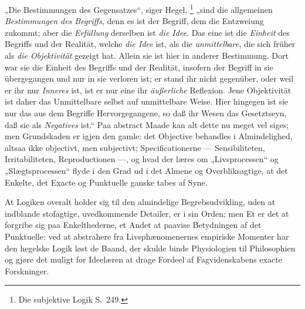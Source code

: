 \documentclass[12pt]{book}
\newcommand{\opage}[1]{\marginnote{\footnotesize\textit{[#1]}}}
\begin{document}
„Die Bestimmungen des Gegensatzes“, siger Hegel,%
\footnote{Die subjektive Logik S.~249.}
„sind die allgemeinen \emph{Bestimmungen des Begriffs}, denn es ist der Begriff, dem die
Entzweiung zukommt; aber die \emph{Erfüllung} derselben ist \emph{die Idee}. Das eine ist die
\emph{Einheit} des Begriffs und der Realität, welche \emph{die Idee} ist, als die
\emph{unmittelbare}, die sich früher als \emph{die Objektivität} gezeigt hat. Allein sie ist hier
in anderer Bestimmung. Dort war sie die Einheit des Begriffs und der Realität, insofern der
Begriff in sie übergegangen und nur in sie verloren ist; er stand ihr nicht gegenüber, oder weil
er ihr nur \emph{Inneres} ist, ist er nur eine ihr \emph{äußerliche} Reflexion. Jene Objektivität
ist daher das Unmittelbare selbst auf unmittelbare Weise. Hier hingegen ist sie nur das aus dem
Begriffe Hervorgegangene, so daß ihr Wesen das Gesetztseyn, daß sie als \emph{Negatives} ist.“
Paa abstract Maade kan alt dette nu meget vel siges; men Grundskaden er igjen den gamle: det
Objective behandles i Almindelighed, altsaa ikke objectivt, men subjectivt; Specificationerne ---
Sensibiliteten, Irritabiliteten, Reproductionen ---, og hvad der læres om „Livsprocessen“ og
„Slægtsprocessen“ flyde i den Grad ud i det Almene og Overbliksagtige, at det Enkelte, det Exacte
og Punktuelle ganske tabes af Syne.

At Logiken overalt holder sig til den almindelige Begrebsudvikling, uden at indblande stofagtige,
uvedkommende Detailer, er i sin Orden; men Et er det at forgribe sig paa Enkelthederne, et Andet
at paavise Betydningen af det Punktuelle: ved at abstrahere fra Livsphænomenernes empiriske
Momenter
\opage{407} har den hegelske Logik løst de Baand, der skulde binde Physiologien til Philosophien og gjøre det
muligt for Ideelæren at drage Fordeel af Fagvidenskabens exacte Forskninger.
\end{document}
